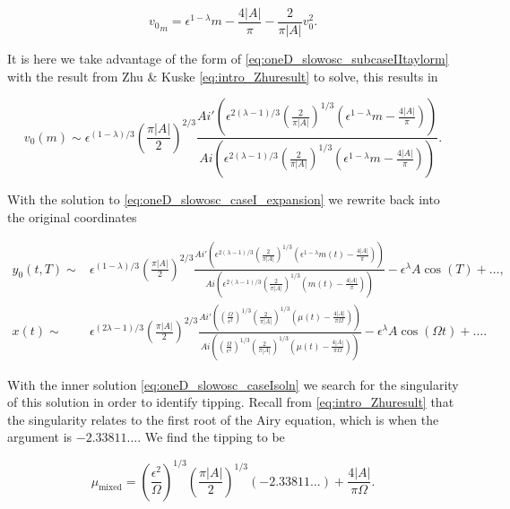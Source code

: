 \begin{equation}\label{eq:oneD_slowosc_subcaseIItaylorm}
{v_0}_m = \epsilon^{1-\lambda}m - \frac{4|A|}{\pi} - \frac{2}{\pi |A|}v_0^2.
\end{equation}

It is here we take advantage of the form of \eqref{eq:oneD_slowosc_subcaseIItaylorm} with the result from Zhu \& Kuske \eqref{eq:intro_Zhuresult} to solve, this results in

\begin{equation*}
v_0(m)\sim \epsilon^{(1-\lambda)/3}\left( \frac{\pi |A|}{2} \right)^{2/3}\frac{Ai'\left(\epsilon^{2(\lambda-1)/3}\left(\frac{2}{\pi |A|}\right)^{1/3}(\epsilon^{1-\lambda}m-\frac{4|A|}{\pi})\right)}{Ai\left(\epsilon^{2(\lambda-1)/3}\left(\frac{2}{\pi |A|}\right)^{1/3}(\epsilon^{1-\lambda}m-\frac{4|A|}{\pi})\right)}.
\end{equation*}

With the solution to \eqref{eq:oneD_slowosc_caseI_expansion} we rewrite back into the original coordinates

\begin{equation}\label{eq:oneD_slowosc_caseIsoln}
\begin{aligned}
y_0(t,T)\sim& \epsilon^{(1-\lambda)/3}\left( \frac{\pi |A|}{2} \right)^{2/3}\frac{Ai'\left(\epsilon^{2(\lambda-1)/3}\left(\frac{2}{\pi |A|}\right)^{1/3}(\epsilon^{1-\lambda}m(t)-\frac{4|A|}{\pi})\right)}{Ai\left(\epsilon^{2(\lambda-1)/3}\left(\frac{2}{\pi |A|}\right)^{1/3}(m(t)-\frac{4|A|}{\pi})\right)}-\epsilon^\lambda A\cos(T)+\ldots,\\
x(t) \sim& \epsilon^{(2\lambda-1)/3}\left(\frac{\pi |A|}{2}\right)^{2/3}\frac{Ai'\left(\left(\frac{\Omega}{\epsilon^2}\right)^{1/3}\left(\frac{2}{\pi |A|}\right)^{1/3}(\mu(t)-\frac{4|A|}{\pi \Omega})\right)}{Ai\left(\left(\frac{\Omega}{\epsilon^2}\right)^{1/3}\left(\frac{2}{\pi |A|}\right)^{1/3}(\mu(t)-\frac{4|A|}{\pi \Omega})\right)}-\epsilon^\lambda A\cos(\Omega t) +\ldots.
\end{aligned}
\end{equation}

With the inner solution \eqref{eq:oneD_slowosc_caseIsoln} we search for the singularity of this solution in order to identify tipping. Recall from \eqref{eq:intro_Zhuresult} that the singularity relates to the first root of the Airy equation, which is when the argument is $-2.33811\ldots$. We find the tipping to be

\begin{equation}\label{eq:oneD_slowosc_uglymu}
\mu_{\text{mixed}}=\left(\frac{\epsilon^2}{\Omega}\right)^{1/3}\left(\frac{\pi |A|}{2}\right)^{1/3}(-2.33811\ldots)+\frac{4|A|}{\pi \Omega}.
\end{equation}

